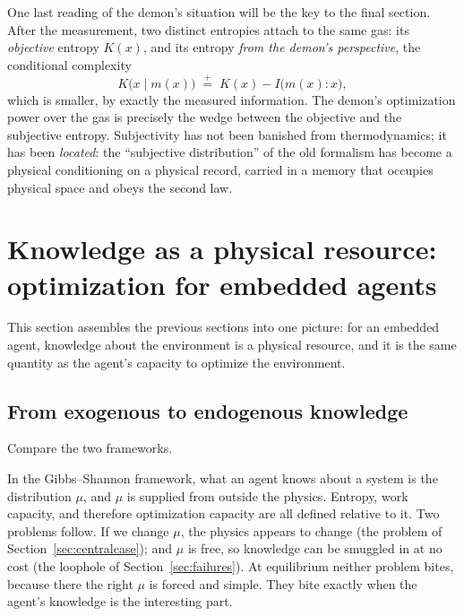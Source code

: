 \documentclass[10pt]{article}
\theoremstyle{definition}
\theoremstyle{remark}
\newcommand{\peq}{\mathrel{\stackrel{+}{=}}}
\begin{document}
One last reading of the demon's situation will be the key to the final section. After the measurement, two distinct entropies attach to the same gas: its \emph{objective} entropy $K(x)$, and its entropy \emph{from the demon's perspective}, the conditional complexity
\[
K\big(x \mid m(x)\big) \;\peq\; K(x) - I\big(m(x) : x\big),
\]
which is smaller, by exactly the measured information. The demon's optimization power over the gas is precisely the wedge between the objective and the subjective entropy. Subjectivity has not been banished from thermodynamics; it has been \emph{located}: the ``subjective distribution'' of the old formalism has become a physical conditioning on a physical record, carried in a memory that occupies physical space and obeys the second law.

\section{Knowledge as a physical resource: optimization for embedded agents}
\label{sec:embedded}

This section assembles the previous sections into one picture: for an embedded agent, knowledge about the environment is a physical resource, and it is the same quantity as the agent's capacity to optimize the environment.

\subsection{From exogenous to endogenous knowledge}
\label{sec:endogenous}

Compare the two frameworks.

In the Gibbs--Shannon framework, what an agent knows about a system is the distribution $\mu$, and $\mu$ is supplied from outside the physics. Entropy, work capacity, and therefore optimization capacity are all defined relative to it. Two problems follow. If we change $\mu$, the physics appears to change (the problem of Section~\ref{sec:centralcase}); and $\mu$ is free, so knowledge can be smuggled in at no cost (the loophole of Section~\ref{sec:failures}). At equilibrium neither problem bites, because there the right $\mu$ is forced and simple. They bite exactly when the agent's knowledge is the interesting part.
\end{document}
